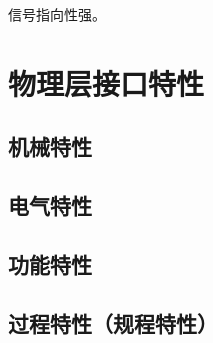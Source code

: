 信号指向性强。


\section{物理层接口特性}

\subsection{机械特性}


\subsection{电气特性}


\subsection{功能特性}


\subsection{过程特性（规程特性）}






